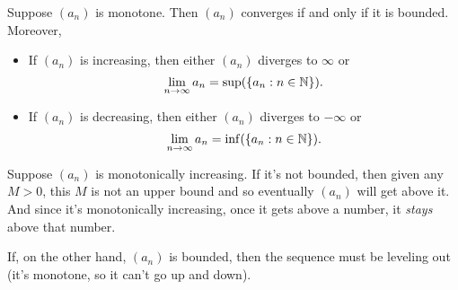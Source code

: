 \begin{theorem}
  Suppose $(a_n)$ is monotone. Then $(a_n)$ converges if and only if
  it is bounded. Moreover,
  \begin{itemize}
    \item If $(a_n)$ is increasing, then either $(a_n)$ diverges to
      $\infty$ or
      \[ \lim_{n \to \infty} a_n = \sup(\{ a_n : n \in \mathbb N \}). \]
    \item If $(a_n)$ is decreasing, then either $(a_n)$ diverges to
      $-\infty$ or
      \[ \lim_{n \to \infty} a_n = \inf(\{ a_n : n \in \mathbb N \}). \]
  \end{itemize}
\end{theorem}

\begin{proofidea}
  Suppose $(a_n)$ is monotonically increasing. If it's not bounded,
  then given any $M > 0$, this $M$ is not an upper bound and so
  eventually $(a_n)$ will get above it. And since it's monotonically
  increasing, once it gets above a number, it \textit{stays} above that number.

  \begin{tightfigure}
    \centering
  \end{tightfigure}

  If, on the other hand, $(a_n)$ is bounded, then the sequence must
  be leveling out (it's monotone, so it can't go up and down).


\end{proofidea}
